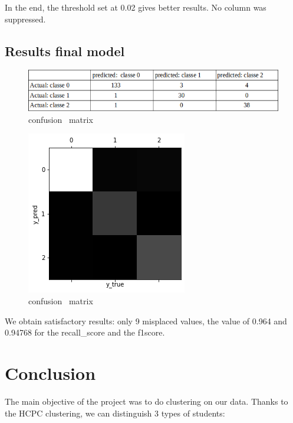 \documentclass[12pt]{article}
\begin{document}
In the end, the threshold set at 0.02 gives better results. No column was suppressed. 

\subsection{Results final model} 

\begin{figure}[H]
\begin{center}
\includegraphics[scale=0.6]{confusion_matrix_1.png} 
\caption[]{  confusion \ matrix }
\end{center}
\end{figure}



\begin{figure}[H]
\begin{center}
\includegraphics[scale=0.6]{confusion_matrix_2.png} 
\caption[]{confusion \ matrix}
\end{center}
\end{figure}

We obtain satisfactory results: 
only 9 misplaced values, the value of 0.964 and 0.94768 for the recall\_score and the f1\-score.

\section{Conclusion}
The main objective of the project was to do clustering on our data.
Thanks to the HCPC clustering, we can distinguish 3 types of students:
\end{document}

